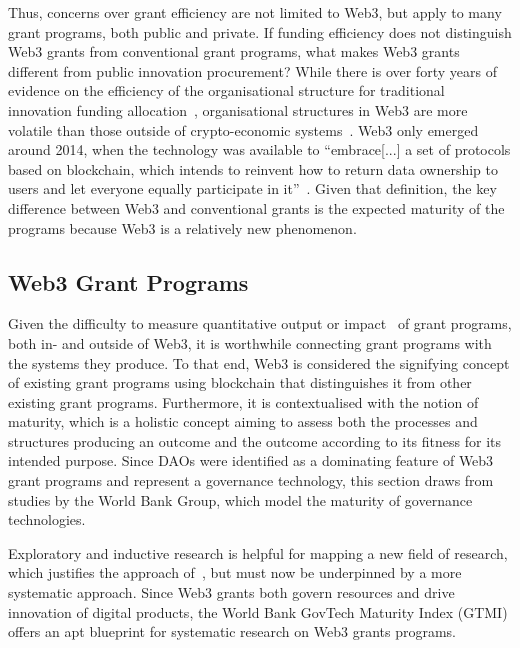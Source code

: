 \documentclass[conference]{IEEEtran}
\begin{document}
Thus, concerns over grant efficiency are not limited to Web3, but apply to many grant programs, both public and private. If funding efficiency does not distinguish Web3 grants from conventional grant programs, what makes Web3 grants different from public innovation procurement? While there is over forty years of evidence on the efficiency of the organisational structure for traditional innovation funding allocation~\cite[p.~4]{holmstrom_agency_1989}, organisational structures in Web3 are more volatile than those outside of crypto-economic systems~\cite[p.~25]{zuo_development_2023}. Web3 only emerged around 2014, when the technology was available to ``embrace[...] a set of protocols based on blockchain, which intends to reinvent how to return data ownership to users and let everyone equally participate in it''~\cite[p.~4]{wan_web3_2023}. Given that definition, the key difference between Web3 and conventional grants is the expected maturity of the programs because Web3 is a relatively new phenomenon.\\

\subsection{Web3 Grant Programs}

Given the difficulty to measure quantitative output or impact~\cite{ding_desci_2022,howell_financing_2017} of grant programs, both in- and outside of Web3, it is worthwhile connecting grant programs with the systems they produce. To that end, Web3 is considered the signifying concept of existing grant programs using blockchain that distinguishes it from other existing grant programs. Furthermore, it is contextualised with the notion of maturity, which is a holistic concept aiming to assess both the processes and structures producing an outcome and the outcome according to its fitness for its intended purpose. Since DAOs were identified as a dominating feature of Web3 grant programs and represent a governance technology, this section draws from studies by the World Bank Group, which model the maturity of governance technologies.

Exploratory and inductive research is helpful for mapping a new field of research, which justifies the approach of~\cite{leventhal_state_2023_long}, but must now be underpinned by a more systematic approach. Since Web3 grants both govern resources and drive innovation of digital products, the World Bank GovTech Maturity Index (GTMI) offers an apt blueprint for systematic research on Web3 grants programs.
\end{document}
